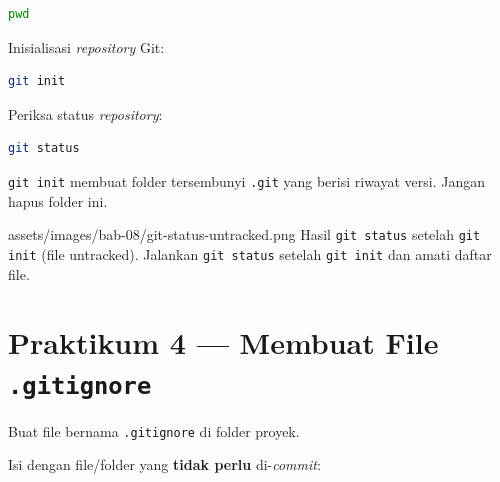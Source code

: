 \begin{lstlisting}[language=bash, caption={Memeriksa direktori kerja}, label={lst:git-pwd}]
pwd
\end{lstlisting}

\begin{langkah}
  \item Inisialisasi \emph{repository} Git:
\end{langkah}

\begin{lstlisting}[language=bash, caption={Inisialisasi repository}, label={lst:git-init}]
git init
\end{lstlisting}

\begin{langkah}
  \item Periksa status \emph{repository}:
\end{langkah}

\begin{lstlisting}[language=bash, caption={Memeriksa status repository}, label={lst:git-status-1}]
git status
\end{lstlisting}

\begin{catatan}
\texttt{git init} membuat folder tersembunyi \texttt{.git} yang berisi riwayat versi. Jangan hapus folder ini.
\end{catatan}

\begin{tangkapanlayar}
  {assets/images/bab-08/git-status-untracked.png}
  {Hasil \texttt{git status} setelah \texttt{git init} (file untracked).}
  {Jalankan \texttt{git status} setelah \texttt{git init} dan amati daftar file.}
\end{tangkapanlayar}

\section{Praktikum 4 --- Membuat File \texttt{.gitignore}}
\label{sec:git-praktik-4}

\begin{langkah}
  \item Buat file bernama \texttt{.gitignore} di folder proyek.
  \item Isi dengan file/folder yang \textbf{tidak perlu} di-\emph{commit}:
\end{langkah}

